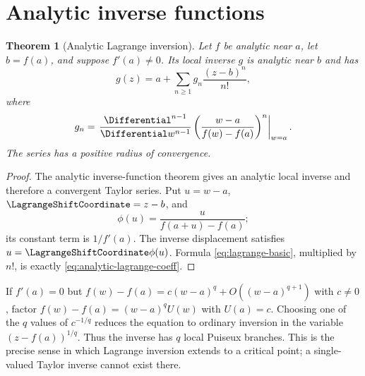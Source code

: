 \documentclass[11pt,a4paper,oneside,openany]{book}
\newtheorem{theorem}{Theorem}[chapter]
\theoremstyle{definition}
\theoremstyle{remark}
\begin{document}
\section{Analytic inverse functions}
\begin{theorem}[Analytic Lagrange inversion]\label{thm:analytic-lagrange}
Let $f$ be analytic near $a$, let $b=f(a)$, and suppose $f'(a)\ne0$.  Its local
inverse $g$ is analytic near $b$ and has
\begin{equation}\label{eq:analytic-lagrange-series}
 g(z)=a+\sum_{n\ge1}g_n\frac{(z-b)^n}{n!},
\end{equation}
where
\begin{equation}\label{eq:analytic-lagrange-coeff}
 g_n=\left.\frac{\Differential^{n-1}}{\Differential w^{n-1}}
 \left(\frac{w-a}{f(w)-f(a)}\right)^n\right|_{w=a}.
\end{equation}
The series has a positive radius of convergence.
\end{theorem}
\begin{proof}
The analytic inverse-function theorem gives an analytic local inverse and therefore
a convergent Taylor series.  Put $u=w-a$, $\LagrangeShiftCoordinate=z-b$, and
\[
 \phi(u)=\frac{u}{f(a+u)-f(a)};
\]
its constant term is $1/f'(a)$.  The inverse displacement satisfies
$u=\LagrangeShiftCoordinate\phi(u)$.  Formula \eqref{eq:lagrange-basic}, multiplied by $n!$, is
exactly \eqref{eq:analytic-lagrange-coeff}.
\end{proof}

If $f'(a)=0$ but $f(w)-f(a)=c(w-a)^q+O((w-a)^{q+1})$ with $c\ne0$, factor
$f(w)-f(a)=(w-a)^qU(w)$ with $U(a)=c$.  Choosing one of the $q$ values of
$c^{-1/q}$ reduces the equation to ordinary inversion in the variable
$(z-f(a))^{1/q}$.  Thus the inverse has $q$ local Puiseux branches.  This is the
precise sense in which Lagrange inversion extends to a critical point; a
single-valued Taylor inverse cannot exist there.
\end{document}
